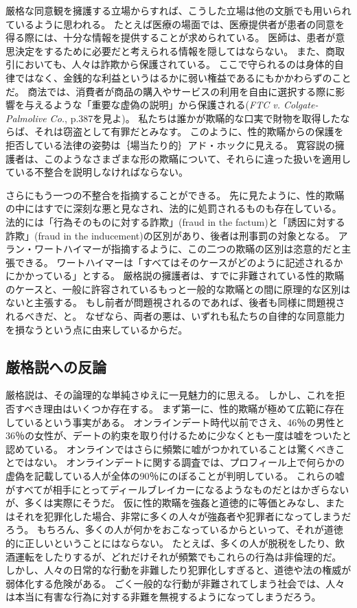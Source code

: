\documentclass[paper=a4,book,openany]{jlreq}
\begin{document}
厳格な同意観を擁護する立場からすれば、こうした立場は他の文脈でも用いられているように思われる。
たとえば医療の場面では、医療提供者が患者の同意を得る際には、十分な情報を提供することが求められている。
医師は、患者が意思決定をするために必要だと考えられる情報を隠してはならない。
また、商取引においても、人々は詐欺から保護されている。
ここで守られるのは身体的自律ではなく、金銭的な利益というはるかに弱い権益であるにもかかわらずのことだ。
商法では、消費者が商品の購入やサービスの利用を自由に選択する際に影響を与えるような「重要な虚偽の説明」から保護される(\emph{FTC v. Colgate-Palmolive Co.}, p.387を見よ)。
私たちは誰かが欺瞞的な口実で財物を取得したならば、それは窃盗として有罪だとみなす。
このように、性的欺瞞からの保護を拒否している法律の姿勢は｛場当たり的｝{アド・ホック}に見える\citep[][pp.69--71を見よ]{estrich87:_real_rape}。
寛容説の擁護者は、このようなさまざまな形の欺瞞について、それらに違った扱いを適用している不整合を説明しなければならない。

さらにもう一つの不整合を指摘することができる。
先に見たように、性的欺瞞の中にはすでに深刻な悪と見なされ、法的に処罰されるものも存在している。
法的には「行為そのものに対する詐欺」(fraud in the factum)と「誘因に対する詐欺」(fraud in the inducement)の区別があり、後者は刑事罰の対象となる。
アラン・ワートハイマーが指摘するように、この二つの欺瞞の区別は恣意的だと主張できる。
ワートハイマーは「すべてはそのケースがどのように記述されるかにかかっている」とする\citep[p.206]{wertheimer03:_consen_sexual_relat}。
厳格説の擁護者は、すでに非難されている性的欺瞞のケースと、一般に許容されているもっと一般的な欺瞞との間に原理的な区別はないと主張する。
もし前者が問題視されるのであれば、後者も同様に問題視されるべきだ、と。
なぜなら、両者の悪は、いずれも私たちの自律的な同意能力を損なうという点に由来しているからだ。

\subsection{厳格説への反論}

厳格説は、その論理的な単純さゆえに一見魅力的に思える。
しかし、これを拒否すべき理由はいくつか存在する。
まず第一に、性的欺瞞が極めて広範に存在しているという事実がある。
オンラインデート時代以前でさえ、46％の男性と36％の女性が、デートの約束を取り付けるために少なくとも一度は嘘をついたと認めている\citep{rowatt99:_lying_get_date}。
オンラインではさらに頻繁に嘘がつかれていることは驚くべきことではない。
オンラインデートに関する調査では、プロフィール上で何らかの虚偽を記載している人が全体の90％にのぼることが判明している\citep{hancock07:_truth_lying_onlin_datin_profil}。
これらの嘘がすべてが相手にとってディールブレイカーになるようなものだとはかぎらないが、多くは実際にそうだ。
仮に性的欺瞞を強姦と道徳的に等価とみなし、またはそれを犯罪化した場合、非常に多くの人々が強姦者や犯罪者になってしまうだろう。
もちろん、多くの人が何かをおこなっているからといって、それが道徳的に正しいということにはならない。
たとえば、多くの人が脱税をしたり、飲酒運転をしたりするが、どれだけそれが頻繁でもこれらの行為は非倫理的だ。
しかし、人々の日常的な行動を非難したり犯罪化しすぎると、道徳や法の権威が弱体化する危険がある。
ごく一般的な行動が非難されてしまう社会では、人々は本当に有害な行為に対する非難を無視するようになってしまうだろう。
\end{document}
